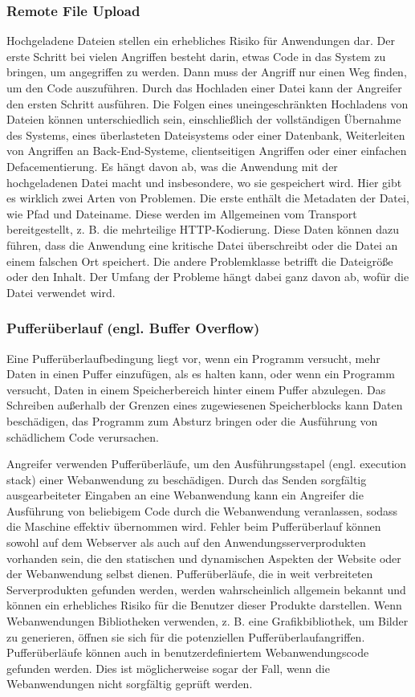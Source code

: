 \subsubsection{Remote File Upload}

Hochgeladene Dateien stellen ein erhebliches Risiko für Anwendungen dar. Der erste Schritt bei vielen Angriffen besteht darin, etwas Code in das System zu bringen, um angegriffen zu werden. Dann muss der Angriff nur einen Weg finden, um den Code auszuführen. Durch das Hochladen einer Datei kann der Angreifer den ersten Schritt ausführen. Die Folgen eines uneingeschränkten Hochladens von Dateien können unterschiedlich sein, einschließlich der vollständigen Übernahme des Systems, eines überlasteten Dateisystems oder einer Datenbank, Weiterleiten von Angriffen an Back-End-Systeme, clientseitigen Angriffen oder einer einfachen Defacementierung. Es hängt davon ab, was die Anwendung mit der hochgeladenen Datei macht und insbesondere, wo sie gespeichert wird. Hier gibt es wirklich zwei Arten von Problemen. Die erste enthält die Metadaten der Datei, wie Pfad und Dateiname. Diese werden im Allgemeinen vom Transport bereitgestellt, z. B. die mehrteilige HTTP-Kodierung. Diese Daten können dazu führen, dass die Anwendung eine kritische Datei überschreibt oder die Datei an einem falschen Ort speichert. Die andere Problemklasse betrifft die Dateigröße oder den Inhalt. Der Umfang der Probleme hängt dabei ganz davon ab, wofür die Datei verwendet wird\cite{fileremotevul18}. 

\subsubsection{Pufferüberlauf (engl. Buffer Overflow)}

Eine Pufferüberlaufbedingung liegt vor, wenn ein Programm versucht, mehr Daten in einen Puffer einzufügen, als es halten kann, oder wenn ein Programm versucht, Daten in einem Speicherbereich hinter einem Puffer abzulegen. Das Schreiben außerhalb der Grenzen eines zugewiesenen Speicherblocks kann Daten beschädigen, das Programm zum Absturz bringen oder die Ausführung von schädlichem Code verursachen. 

Angreifer verwenden Pufferüberläufe, um den Ausführungsstapel (engl. execution stack) einer Webanwendung zu beschädigen. Durch das Senden sorgfältig ausgearbeiteter Eingaben an eine Webanwendung kann ein Angreifer die Ausführung von beliebigem Code durch die Webanwendung veranlassen, sodass die Maschine effektiv übernommen wird. Fehler beim Pufferüberlauf können sowohl auf dem Webserver als auch auf den Anwendungsserverprodukten vorhanden sein, die den statischen und dynamischen Aspekten der Website oder der Webanwendung selbst dienen. Pufferüberläufe, die in weit verbreiteten Serverprodukten gefunden werden, werden wahrscheinlich allgemein bekannt und können ein erhebliches Risiko für die Benutzer dieser Produkte darstellen. Wenn Webanwendungen Bibliotheken verwenden, z. B. eine Grafikbibliothek, um Bilder zu generieren, öffnen sie sich für die potenziellen Pufferüberlaufangriffen. Pufferüberläufe können auch in benutzerdefiniertem Webanwendungscode gefunden werden. Dies ist möglicherweise sogar der Fall, wenn die Webanwendungen nicht sorgfältig geprüft werden. 

